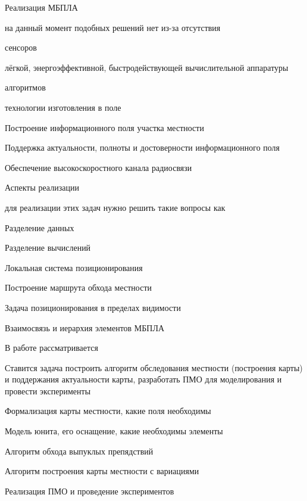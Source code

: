 \begin{docsec}{Реализация МБПЛА}

\item на данный момент подобных решений нет из-за отсутствия
    \begin{mintemize}
        \item сенсоров
        \item лёгкой, энергоэффективной, быстродействующей вычислительной
              аппаратуры
        \item алгоритмов
        \item технологии изготовления в поле
    \end{mintemize}

\item
    \begin{mintemize}
        \item Построение информационного поля участка местности
        \item Поддержка актуальности, полноты и достоверности информационного поля
        \item Обеспечение высокоскоростного канала радиосвязи
    \end{mintemize}

\end{docsec}

\begin{docsec}{Аспекты реализации}

\item для реализации этих задач нужно решить такие вопросы как
    \begin{mintemize}
        \item Разделение данных
        \item Разделение вычислений
        \item Локальная система позиционирования
        \item Построение маршрута обхода местности
        \item Задача позиционирования в пределах видимости
        \item Взаимосвязь и иерархия элементов МБПЛА
    \end{mintemize}

\end{docsec}

\begin{docsec}{В работе рассматривается}

\item Ставится задача построить алгоритм обследования
      местности (построения карты) и поддержания актуальности
      карты, разработать ПМО для моделирования и провести
      эксперименты

\item Формализация карты местности, какие поля необходимы
\item Модель юнита, его оснащение, какие необходимы элементы
\item Алгоритм обхода выпуклых препядствий
\item Алгоритм построения карты местности
    с вариациями
\item Реализация ПМО и проведение экспериментов

\end{docsec}

